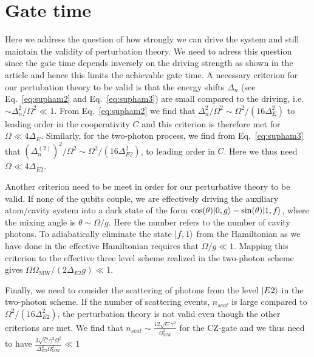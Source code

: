 \section{Gate time}
Here we address the question of how strongly we can drive the system and still
maintain the validity of perturbation theory. We need to adress this question
since the gate time depends inversely on the driving strength as shown in the
article and hence this limits the achievable gate time. A necessary criterion
for our pertubation theory to be valid is that the energy shifts $\Delta_{n}$
(see Eq.~\eqref{eq:supham2} and Eq.~\eqref{eq:supham3}) are small compared to
the driving, i.e. $\sim\Delta_{n}^{2}/\Omega^{2}\ll1$. From
Eq.~\eqref{eq:supham2} we find that
$\Delta_{n}^{2}/\Omega^{2}\sim\Omega^{2}/(16\Delta_{E}^{2})$ to leading order in
the cooperativity $C$ and this criterion is therefore met for
$\Omega\ll4\Delta_{E}$. Similarly, for the two-photon process, we find from
Eq.~\eqref{eq:supham3} that
$(\Delta_{n}^{(2)})^{2}/\Omega^{2}\sim\Omega^{2}/(16\Delta_{E2}^{2})$, to
leading order in $C$. Here we thus need $\Omega\ll4\Delta_{E2}$.

Another criterion need to be meet in order for our perturbative theory to be
valid. If none of the qubits couple, we are effectively driving the auxiliary
atom/cavity system into a dark state of the form
$\cos(\theta)| 0,g \rangle-\sin(\theta)| 1,f \rangle$, where the mixing angle is
$\theta\sim\Omega/g$. Here the number refers to the number of cavity photons. To
adiabatically eliminate the state $| f,1 \rangle$ from the Hamiltonian as we have
done in the effective Hamiltonian requires that $\Omega/g\ll1$. Mapping this
criterion to the effective three level scheme realized in the two-photon scheme
gives $\Omega\Omega_{\text{MW}}/(2\Delta_{E2}g)\ll1$.

Finally, we need to consider the scattering of photons from the level $| E2 \rangle$
in the two-photon scheme. If the number of scattering events, $n_{scat}$ is
large compared to $\Omega^{2}/(16\Delta_{E2}^{2})$, the perturbation theory is
not valid even though the other criterions are met. We find that
$n_{scat}\sim\frac{12\sqrt{C}\gamma^{2}}{\Omega_{\text{MW}}^{2}}$ for the
CZ-gate and we thus need to have 
$\frac{3\sqrt{C}\gamma^{2}\Omega^{2}}{\Delta_{E2}^{2}\Omega_{\text{MW}}^{2}}\ll1$

